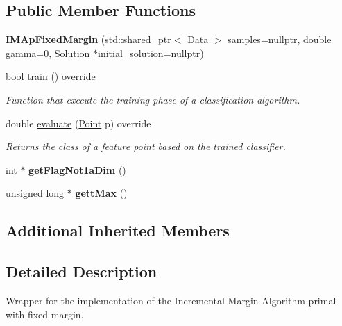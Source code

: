 \subsection*{Public Member Functions}
\begin{DoxyCompactItemize}
\item 
\mbox{\label{class_i_m_ap_fixed_margin_ac211e503f485e28c2d362d1184859c4e}} 
{\bfseries I\+M\+Ap\+Fixed\+Margin} (std\+::shared\+\_\+ptr$<$ \hyperlink{class_data}{Data} $>$ \hyperlink{class_classifier_aad6a4fcea8f44339d7a6302f530852ca}{samples}=nullptr, double gamma=0, \hyperlink{class_solution}{Solution} $\ast$initial\+\_\+solution=nullptr)
\item 
bool \hyperlink{class_i_m_ap_fixed_margin_a79fd9791d7c0998706f280d446ece5ee}{train} () override
\begin{DoxyCompactList}\small\item\em Function that execute the training phase of a classification algorithm. \end{DoxyCompactList}\item 
double \hyperlink{class_i_m_ap_fixed_margin_a97272623213a2bdac41c171fe0522302}{evaluate} (\hyperlink{class_point}{Point} p) override
\begin{DoxyCompactList}\small\item\em Returns the class of a feature point based on the trained classifier. \end{DoxyCompactList}\item 
\mbox{\label{class_i_m_ap_fixed_margin_ab19fc4f2f6dfa772f279e74cd36553e3}} 
int $\ast$ {\bfseries get\+Flag\+Not1a\+Dim} ()
\item 
\mbox{\label{class_i_m_ap_fixed_margin_a542018e09de5ffdcee81844c2b82f22c}} 
unsigned long $\ast$ {\bfseries gett\+Max} ()
\end{DoxyCompactItemize}
\subsection*{Additional Inherited Members}


\subsection{Detailed Description}
Wrapper for the implementation of the Incremental Margin Algorithm primal with fixed margin. 

